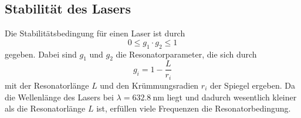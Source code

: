 \subsection{Stabilität des Lasers}
\label{sec:Stabilitaet}
Die Stabilitätsbedingung für einen Laser ist durch
\begin{equation}
    \label{eq:stabil}
    0 \leq g_1 \cdot g_2 \leq 1
\end{equation}
gegeben. Dabei sind $g_1$ und $g_2$ die Resonatorparameter, die sich durch
\begin{equation}
    \label{eq:param}
    g_i = 1 - \frac{L}{r_i}
\end{equation}
mit der Resonatorlänge $L$ und den Krümmungsradien $r_i$ der Spiegel ergeben. Da die Wellenlänge des Lasers
bei $\lambda = \SI{632,8}{\nano\meter}$ liegt und dadurch wesentlich kleiner als die Resonatorlänge $L$ ist,
erfüllen viele Frequenzen die Resonatorbedingung.
